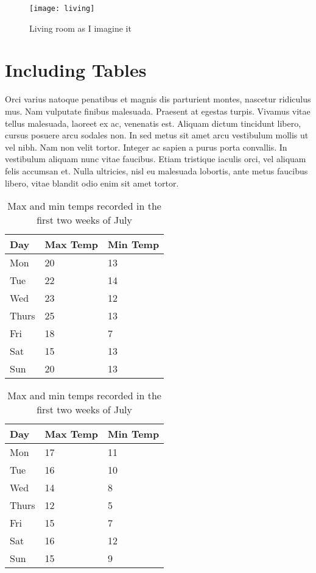 \begin{figure}[ht]
	\centering
	\texttt{[image: living]}
	\caption{Living room as I imagine it}
	\label{fig:living}
\end{figure}

\section{Including Tables}
Orci varius natoque penatibus et magnis dis parturient montes, nascetur ridiculus mus. Nam vulputate finibus malesuada. Praesent at egestas turpis. Vivamus vitae tellus malesuada, laoreet ex ac, venenatis est. Aliquam dictum tincidunt libero, cursus posuere arcu sodales non. In sed metus sit amet arcu vestibulum mollis ut vel nibh. Nam non velit tortor. Integer ac sapien a purus porta convallis. In vestibulum aliquam nunc vitae faucibus. Etiam tristique iaculis orci, vel aliquam felis accumsan et. Nulla ultricies, nisl eu malesuada lobortis, ante metus faucibus libero, vitae blandit odio enim sit amet tortor.

\begin{table}[ht!]
    \begin{subtable}[h]{0.45\textwidth}
        \centering
        \begin{tabular}{l | l | l}
        Day & Max Temp & Min Temp \\
        \hline \hline
        Mon & 20 & 13\\
        Tue & 22 & 14\\
        Wed & 23 & 12\\
        Thurs & 25 & 13\\
        Fri & 18 & 7\\
        Sat & 15 & 13\\
        Sun & 20 & 13
        \end{tabular}
        \caption{First Week}
        \label{tab:week1}
    \end{subtable}
    \hfill
    \begin{subtable}[h]{0.45\textwidth}
        \centering
        \begin{tabular}{l | l | l}
        Day & Max Temp & Min Temp \\
        \hline \hline
        Mon & 17 & 11\\
        Tue & 16 & 10\\
        Wed & 14 & 8\\
        Thurs & 12 & 5\\
        Fri & 15 & 7\\
        Sat & 16 & 12\\
        Sun & 15 & 9
        \end{tabular}
        \caption{Second Week}
        \label{tab:week2}
    \end{subtable}
    \caption{Max and min temps recorded in the first two weeks of July}
    \label{tab:temps}
\end{table}

